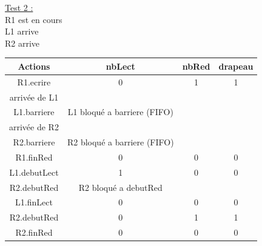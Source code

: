 \documentclass[11pt,a4paper]{article}
\begin{document}
\underline{Test 2 :} \\
R1 est en cours\\
\indent L1 arrive \\
\indent R2 arrive\\
\begin{center}
    \begin{tabular}{|c|c|c|c|}
        \hline 
        \rule[-1ex]{0pt}{2.5ex} \textbf{Actions} & \textbf{nbLect}              & \textbf{nbRed} & \textbf{drapeau} \\ 
        \hline 
        \rule[-1ex]{0pt}{2.5ex} R1.ecrire        & 0                            & 1              & 1                \\ 
        \hline 
        \rule[-1ex]{0pt}{2.5ex} arrivée de L1   &                              &                &                  \\ 
        \hline 
        \rule[-1ex]{0pt}{2.5ex} L1.barriere      & L1 bloqué a barriere (FIFO) &                &                  \\ 
        \hline 
        \rule[-1ex]{0pt}{2.5ex} arrivée de R2   &                              &                &                  \\ 
        \hline 
        \rule[-1ex]{0pt}{2.5ex} R2.barriere      & R2 bloqué a barriere (FIFO) &                &                  \\ 
        \hline 
        \rule[-1ex]{0pt}{2.5ex} R1.finRed        & 0                            & 0              & 0                \\ 
        \hline 
        \rule[-1ex]{0pt}{2.5ex} L1.debutLect     & 1                            & 0              & 0                \\ 
        \hline 
        \rule[-1ex]{0pt}{2.5ex} R2.debutRed      & R2 bloqué a debutRed        &                &                  \\ 
        \hline 
        \rule[-1ex]{0pt}{2.5ex} L1.finLect       & 0                            & 0              & 0                \\ 
        \hline 
        \rule[-1ex]{0pt}{2.5ex} R2.debutRed      & 0                            & 1              & 1                \\ 
        \hline 
        \rule[-1ex]{0pt}{2.5ex} R2.finRed        & 0                            & 0              & 0                \\ 
        \hline 
    \end{tabular} 
\end{center}
\newpage
\end{document}
